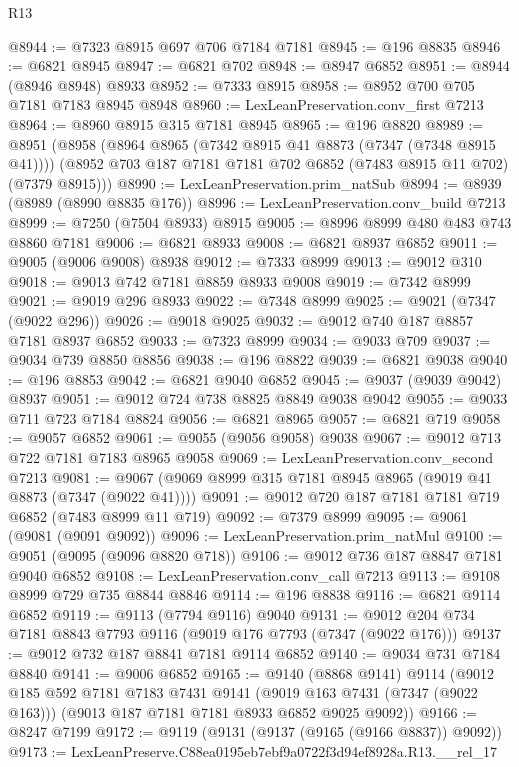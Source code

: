\begin{lexlean}{R13}
\begin{coremodule}
@8944 := @7323 @8915 @697 @706 @7184 @7181
@8945 := @196 @8835
@8946 := @6821 @8945
@8947 := @6821 @702
@8948 := @8947 @6852
@8951 := @8944 (@8946 @8948) @8933
@8952 := @7333 @8915
@8958 := @8952 @700 @705 @7181 @7183 @8945 @8948
@8960 := LexLeanPreservation.conv_first @7213
@8964 := @8960 @8915 @315 @7181 @8945
@8965 := @196 @8820
@8989 := @8951
    (@8958
      (@8964 @8965 (@7342 @8915 @41 @8873 (@7347 (@7348 @8915 @41))))
      (@8952 @703 @187 @7181 @7181 @702 @6852 (@7483 @8915 @11 @702) (@7379 @8915)))
@8990 := LexLeanPreservation.prim_natSub
@8994 := @8939 (@8989 (@8990 @8835 @176))
@8996 := LexLeanPreservation.conv_build @7213
@8999 := @7250 (@7504 @8933) @8915
@9005 := @8996 @8999 @480 @483 @743 @8860 @7181
@9006 := @6821 @8933
@9008 := @6821 @8937 @6852
@9011 := @9005 (@9006 @9008) @8938
@9012 := @7333 @8999
@9013 := @9012 @310
@9018 := @9013 @742 @7181 @8859 @8933 @9008
@9019 := @7342 @8999
@9021 := @9019 @296 @8933
@9022 := @7348 @8999
@9025 := @9021 (@7347 (@9022 @296))
@9026 := @9018 @9025
@9032 := @9012 @740 @187 @8857 @7181 @8937 @6852
@9033 := @7323 @8999
@9034 := @9033 @709
@9037 := @9034 @739 @8850 @8856
@9038 := @196 @8822
@9039 := @6821 @9038
@9040 := @196 @8853
@9042 := @6821 @9040 @6852
@9045 := @9037 (@9039 @9042) @8937
@9051 := @9012 @724 @738 @8825 @8849 @9038 @9042
@9055 := @9033 @711 @723 @7184 @8824
@9056 := @6821 @8965
@9057 := @6821 @719
@9058 := @9057 @6852
@9061 := @9055 (@9056 @9058) @9038
@9067 := @9012 @713 @722 @7181 @7183 @8965 @9058
@9069 := LexLeanPreservation.conv_second @7213
@9081 := @9067 (@9069 @8999 @315 @7181 @8945 @8965 (@9019 @41 @8873 (@7347 (@9022 @41))))
@9091 := @9012 @720 @187 @7181 @7181 @719 @6852 (@7483 @8999 @11 @719)
@9092 := @7379 @8999
@9095 := @9061 (@9081 (@9091 @9092))
@9096 := LexLeanPreservation.prim_natMul
@9100 := @9051 (@9095 (@9096 @8820 @718))
@9106 := @9012 @736 @187 @8847 @7181 @9040 @6852
@9108 := LexLeanPreservation.conv_call @7213
@9113 := @9108 @8999 @729 @735 @8844 @8846
@9114 := @196 @8838
@9116 := @6821 @9114 @6852
@9119 := @9113 (@7794 @9116) @9040
@9131 := @9012 @204 @734 @7181 @8843 @7793 @9116 (@9019 @176 @7793 (@7347 (@9022 @176)))
@9137 := @9012 @732 @187 @8841 @7181 @9114 @6852
@9140 := @9034 @731 @7184 @8840
@9141 := @9006 @6852
@9165 := @9140
    (@8868 @9141)
    @9114
    (@9012
      @185
      @592
      @7181
      @7183
      @7431
      @9141
      (@9019 @163 @7431 (@7347 (@9022 @163)))
      (@9013 @187 @7181 @7181 @8933 @6852 @9025 @9092))
@9166 := @8247 @7199
@9172 := @9119 (@9131 (@9137 (@9165 (@9166 @8837)) @9092))
@9173 := LexLeanPreserve.C88ea0195eb7ebf9a0722f3d94ef8928a.R13.__rel_17

\end{coremodule}
\end{lexlean}

